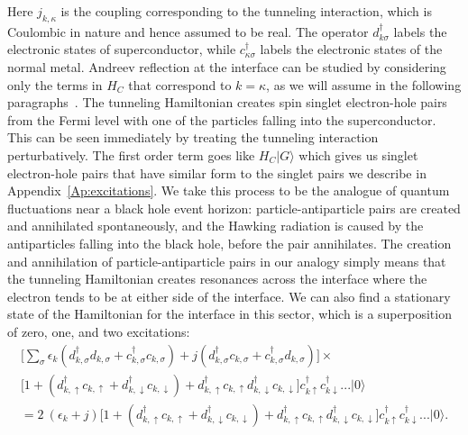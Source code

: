 \documentclass[12pt,letterpaper,aps,onecolumn,superscriptaddress,floatfix,notitlepage]{revtex4-1}
\begin{document}
	Here $j_{k, \kappa}$ is the coupling corresponding to the tunneling interaction, which is Coulombic in nature and hence assumed to be real. The operator $d^{\dagger}_{k\sigma}$ labels the electronic states of superconductor, while $c^{\dagger}_{\kappa\sigma}$ labels the electronic states of the normal metal. Andreev reflection at the interface can be studied by considering only the terms in $H_{C}$ that correspond to $k=\kappa$, as we will assume in the following paragraphs~\cite{ARsecond}. The tunneling Hamiltonian creates spin singlet electron-hole pairs from the Fermi level with one of the particles falling into the superconductor. This can be seen immediately by treating the tunneling interaction perturbatively. The first order term goes like $H_{C}|G\rangle$ which gives us singlet electron-hole pairs that have similar form to the singlet pairs we describe in Appendix~\ref{Ap:excitations}. We take this process to be the analogue of quantum fluctuations near a black hole event horizon: particle-antiparticle pairs are created and annihilated spontaneously, and the Hawking radiation is caused by the antiparticles falling into the black hole, before the pair annihilates. The creation and annihilation of particle-antiparticle pairs in our analogy simply means that the tunneling Hamiltonian creates resonances across the interface where the electron tends to be at either side of the interface. We can also find a stationary state of the Hamiltonian for the interface in this sector, which is a superposition of zero, one, and two excitations:
	\begin{multline}
	\label{interface}	\bigg[\sum\limits_{\sigma}\epsilon_{k}(d_{k,\sigma}^{\dagger}d_{k,\sigma}+c_{k,\sigma}^{\dagger}c_{k,\sigma}) +  j(d_{k,\sigma}^{\dagger}c_{k,\sigma}+c_{k,\sigma}^{\dagger}d_{k,\sigma}) \bigg] \times\\
	\bigg[1 + (d_{k,\uparrow}^{\dagger}c_{k,\uparrow}+d_{k,\downarrow}^{\dagger}c_{k,\downarrow})+ d_{k,\uparrow}^{\dagger}c_{k,\uparrow}d_{k,\downarrow}^{\dagger}c_{k,\downarrow}\bigg]c_{k\uparrow}^{\dagger}c_{k\downarrow}^{\dagger}...|0\rangle\\
	=2~(\epsilon_{k}+j)\bigg[1 + (d_{k,\uparrow}^{\dagger}c_{k,\uparrow}+d_{k,\downarrow}^{\dagger}c_{k,\downarrow})+ d_{k,\uparrow}^{\dagger}c_{k,\uparrow}d_{k,\downarrow}^{\dagger}c_{k,\downarrow}\bigg]c_{k\uparrow}^{\dagger}c_{k\downarrow}^{\dagger}...|0\rangle.
	\end{multline}
\end{document}
